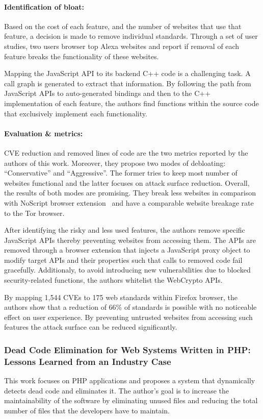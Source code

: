 \paragraph{Identification of bloat:} Based on the cost of each feature, and the number of websites that use that feature, a decision is made to remove individual standards. Through a set of user studies, two users browser top Alexa websites and report if removal of each feature breaks the functionality of these websites.

Mapping the JavaScript API to its backend C++ code is a challenging task. A call graph is generated to extract that information. By following the path from JavaScript APIs to auto-generated bindings and then to the C++ implementation of each feature, the authors find functions within the source code that exclusively implement each functionality.
 \paragraph{Evaluation \& metrics:} CVE reduction and removed lines of code are the two metrics reported by the authors of this work. Moreover, they propose two modes of debloating: ``Conservative'' and ``Aggressive''. The former tries to keep most number of websites functional and the latter focuses on attack surface reduction. Overall, the results of both modes are promising. They break less websites in comparison with NoScript browser extension~\cite{noscript} and have a comparable website breakage rate to the Tor browser.

After identifying the risky and less used features, the authors remove specific JavaScript APIs thereby preventing websites from accessing them. The APIs are removed through a browser extension that injects a JavaScript proxy object to modify target APIs and their properties such that
calls to removed code fail gracefully. Additionaly, to avoid introducing new vulnerabilities due to blocked security-related functions, the authors whitelist the WebCrypto APIs.


By mapping 1,544 CVEs to 175 web standards within Firefox browser, the authors show that a reduction of 66\% of standards is possible with no noticeable effect on user experience. By preventing untrusted websites from accessing such features the attack surface can be reduced significantly.

\subsubsection{Dead Code Elimination for Web Systems Written in PHP: Lessons Learned from an Industry Case}
This work focuses on PHP applications and proposes a system that dynamically detects dead code and eliminates it. The author's goal is to increase the maintainability of the software by eliminating unused files and reducing the total number of files that the developers have to maintain.
